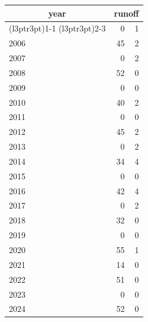 \footnotesize\begin{tabular}[t]{lrr}
\toprule
\multicolumn{1}{c}{year} & \multicolumn{2}{c}{runoff} \\
\cmidrule(l{3pt}r{3pt}){1-1} \cmidrule(l{3pt}r{3pt}){2-3}
  & 0 & 1\\
\midrule
2006 & 45 & 2\\
2007 & 0 & 2\\
2008 & 52 & 0\\
2009 & 0 & 0\\
2010 & 40 & 2\\
2011 & 0 & 0\\
2012 & 45 & 2\\
2013 & 0 & 2\\
2014 & 34 & 4\\
2015 & 0 & 0\\
2016 & 42 & 4\\
2017 & 0 & 2\\
2018 & 32 & 0\\
2019 & 0 & 0\\
2020 & 55 & 1\\
2021 & 14 & 0\\
2022 & 51 & 0\\
2023 & 0 & 0\\
2024 & 52 & 0\\
\bottomrule
\end{tabular}
